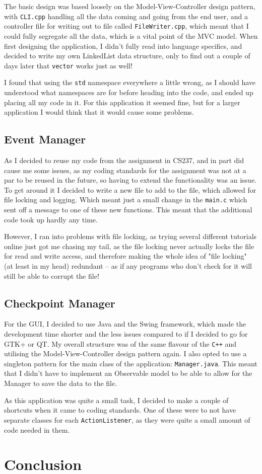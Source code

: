 \documentclass[a4paper]{article}
\begin{document}
The basic design was based loosely on the Model-View-Controller design pattern, with \texttt{CLI.cpp} handling all the data coming and going from the end user, and a controller file for writing out to file called \texttt{FileWriter.cpp}, which meant that I could fully segregate all the data, which is a vital point of the MVC model. When first designing the application, I didn't fully read into language specifics, and decided to write my own LinkedList data structure, only to find out a couple of days later that \texttt{vector} works just as well!

I found that using the \texttt{std} namespace everywhere a little wrong, as I should have understood what namespaces are for before heading into the code, and ended up placing all my code in it. For this application it seemed fine, but for a larger application I would think that it would cause some problems.

\subsection*{Event Manager}

As I decided to reuse my code from the assignment in CS237, and in part did cause me some issues, as my coding standards for the assignment was not at a par to be reused in the future, so having to extend the functionality was an issue. To get around it I decided to write a new file to add to the file, which allowed for file locking and logging. Which meant just a small change in the \texttt{main.c} which sent off a message to one of these new functions. This meant that the additional code took up hardly any time.

However, I ran into problems with file locking, as trying several different tutorials online just got me chasing my tail, as the file locking never actually locks the file for read and write access, and therefore making the whole idea of "file locking" (at least in my head) redundant -- as if any programs who don't check for it will still be able to corrupt the file! 

\subsection*{Checkpoint Manager}

For the GUI, I decided to use Java and the Swing framework, which made the development time shorter and the less issues compared to if I decided to go for GTK+ or QT. My overall structure was of the same flavour of the \texttt{C++} and utilising the Model-View-Controller design pattern again. I also opted to use a singleton pattern for the main class of the application: \texttt{Manager.java}. This meant that I didn't have to implement an Observable model to be able to allow for the Manager to save the data to the file.

As this application was quite a small task, I decided to make a couple of shortcuts when it came to coding standards. One of these were to not have separate classes for each \texttt{ActionListener}, as they were quite a small amount of code needed in them.

\section*{Conclusion}
\end{document}
